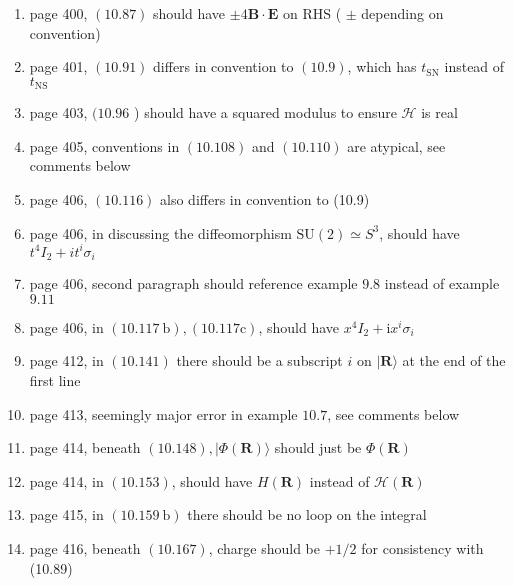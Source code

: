 \documentclass{article}
\begin{document}
\begin{enumerate}
\item page 400, $(10.87)$ should have $\pm 4 \mathbf{B} \cdot \mathbf{E}$ on $\mathrm{RHS}$ ( $\pm$ depending on convention)

\item page 401, $(10.91)$ differs in convention to $(10.9)$, which has $t_{\mathrm{SN}}$ instead of $t_{\mathrm{NS}}$

\item page 403, $(10.96$ ) should have a squared modulus to ensure $\mathcal{H}$ is real

\item page 405, conventions in $(10.108)$ and $(10.110)$ are atypical, see comments below

\item page 406, $(10.116)$ also differs in convention to (10.9)

\item page 406, in discussing the diffeomorphism $\mathrm{SU}(2) \simeq S^{3}$, should have $t^{4} I_{2}+i t^{i} \sigma_{i}$

\item page 406, second paragraph should reference example $9.8$ instead of example $9.11$

\item page 406, in $(10.117 \mathrm{~b}),(10.117 \mathrm{c})$, should have $x^{4} I_{2}+\mathrm{i} x^{i} \sigma_{i}$

\item page 412, in $(10.141)$ there should be a subscript $i$ on $|\mathbf{R}\rangle$ at the end of the first line

\item page 413, seemingly major error in example $10.7$, see comments below

\item page 414, beneath $(10.148),|\Phi(\mathbf{R})\rangle$ should just be $\Phi(\mathbf{R})$

\item page 414, in $(10.153)$, should have $H(\mathbf{R})$ instead of $\mathcal{H}(\mathbf{R})$

\item page 415, in $(10.159 \mathrm{~b})$ there should be no loop on the integral

\item page 416, beneath $(10.167)$, charge should be $+1 / 2$ for consistency with (10.89)
\end{enumerate}
\end{document}
